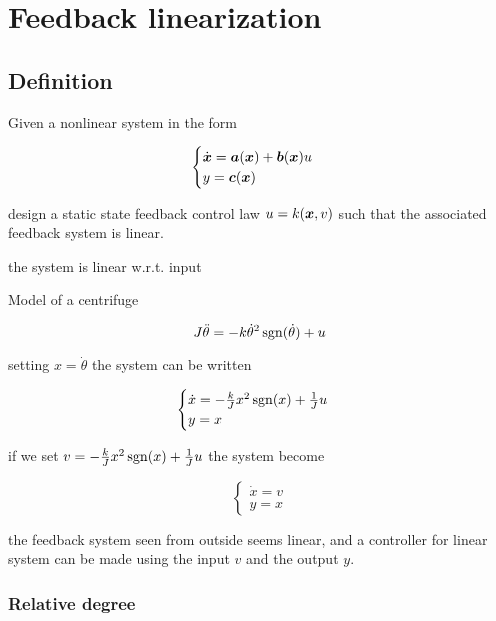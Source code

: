 \usepackage{amsmath}\chapter{Feedback linearization}

\section{Definition}

Given a nonlinear system in the form

\[
    \begin{cases}
        \dot{\boldsymbol{x}} =\boldsymbol{a}(\boldsymbol{x}) + \boldsymbol{b}(\boldsymbol{x}) u \\
        y = \boldsymbol{c}(\boldsymbol{x})
    \end{cases}
\]

design a static state feedback control law $u = k(\boldsymbol{x},v)$ such that the associated feedback system is linear.

\begin{nb}the system is linear w.r.t. input\end{nb}

\begin{example}
    Model of a centrifuge

    \[
        J \ddot\theta = -k \dot \theta^2 \operatorname{sgn}(\dot \theta) + u
    \]

    setting $x = \dot\theta$ the system can be written

    \[
    \begin{cases}
        \dot x = - \frac{k}{J} x^2 \operatorname{sgn}(x) + \frac{1}{J} u \\
        y = x
    \end{cases}
    \]

    if we set $v = - \frac{k}{J}x^2 \operatorname{sgn}(x) + \frac{1}{J}u$ the system become

    \[
    \begin{cases}
        \dot x = v \\
        y = x
    \end{cases}
    \]

    the feedback system seen from outside seems linear, and a controller for linear system can be made using the input $v$ and the output $y$.
\end{example}

\subsection{Relative degree}

